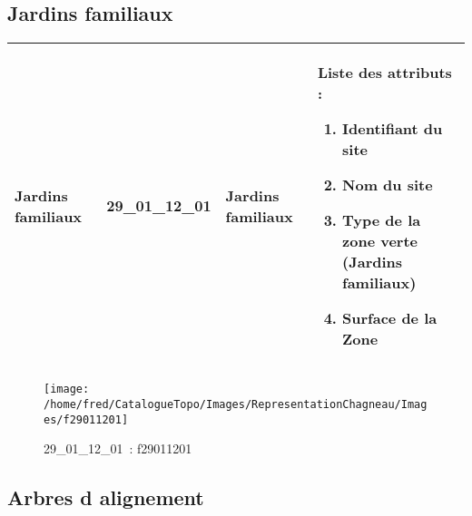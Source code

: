\documentclass[12pt,titlepage]{book}
\begin{document}
\subsection{Jardins familiaux}
\noindent
\vspace{\baselineskip}

\renewcommand{\arraystretch}{1.2}
\begin{supertabular}{|p{10cm}|c|p{13cm}|p{12cm}|}
 Jardins familiaux & 29\_01\_12\_01 & Jardins familiaux & Liste des attributs :
\begin{enumerate}
  \item Identifiant du site  \item Nom du site  \item Type de la zone verte (Jardins familiaux)  \item Surface de la Zone\end{enumerate}
\\
\hline
\end{supertabular}
\begin{figure}[h!]
  \hfill         %
  \begin{minipage}[t]{3cm}
    \begin{center}
      \texttt{[image: /home/fred/CatalogueTopo/Images/RepresentationChagneau/Images/f29011201]}
      \caption[~29\_01\_12\_01]{\small{29\_01\_12\_01~:} \tiny{f29011201}}\label{f29011201}
    \end{center}
  \end{minipage}
\end{figure}


\subsection{Arbres d alignement}
\noindent
\vspace{\baselineskip}
\end{document}
